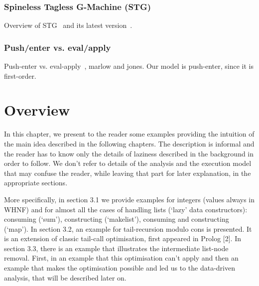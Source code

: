 \documentclass[diploma]{softlab-thesis}
\begin{document}
\subsection{Spineless Tagless G-Machine (STG)}
Overview of STG~\cite{Jo92} and its latest version~\cite{Ma06}.

\subsection{Push/enter vs. eval/apply}
Push-enter vs. eval-apply~\cite{Ma06}, marlow and jones. Our model is push-enter, since it is first-order.







\chapter {Overview}

In this chapter, we present to the reader some examples providing the intuition of the main idea described 
in the following chapters. The description is informal and the reader has to know only the details of laziness 
described in the background in order to follow. We don't refer to details of the analysis and the execution model 
that may confuse the reader, while leaving that part for later explanation, in the appropriate sections.

More specifically, in section 3.1 we provide examples for integers (values always in WHNF) and 
for almost all the cases of handling lists (`lazy' data constructors): 
consuming (`sum'), constructing (`makelist'), consuming and constructing (`map'). 
In section 3.2, an example for tail-recursion modulo cons is presented. It is an extension of classic 
tail-call optimisation, first appeared in Prolog [2].
In section 3.3, there is an example that illustrates the intermediate list-node removal. First, in an example 
that this optimisation can't apply and then an example that makes the optimisation possible and led us to 
the data-driven analysis, that will be described later on.
\end{document}

